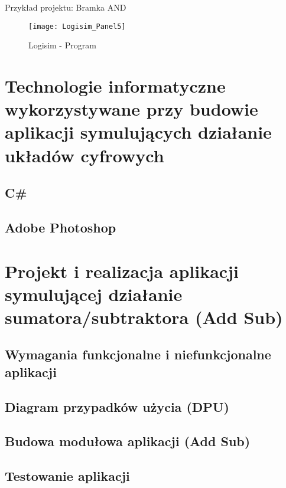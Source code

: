 \documentclass[12pt, a4paper, onside, polish]{article}				%
\begin{document}
  \cleardoublepage
 Przykład projektu: Bramka AND
  	\begin{figure}[hbt!]
  	  {\centering \texttt{[image: Logisim\_Panel5]} \caption{Logisim - Program}}\vspace{5mm}
  	 \end{figure}

\cleardoublepage



\section{Technologie informatyczne wykorzystywane przy budowie aplikacji symulujących działanie układów cyfrowych}
\subsection{C\#}
\cleardoublepage




\subsection{Adobe Photoshop}
\cleardoublepage







\section{Projekt i realizacja aplikacji symulującej działanie sumatora/subtraktora (Add Sub)}
\subsection{Wymagania funkcjonalne i niefunkcjonalne aplikacji}
\cleardoublepage

\subsection{Diagram przypadków użycia (DPU)}
\cleardoublepage

\subsection{Budowa modułowa aplikacji (Add Sub)}
\cleardoublepage

\subsection{Testowanie aplikacji}
\cleardoublepage
\end{document}
